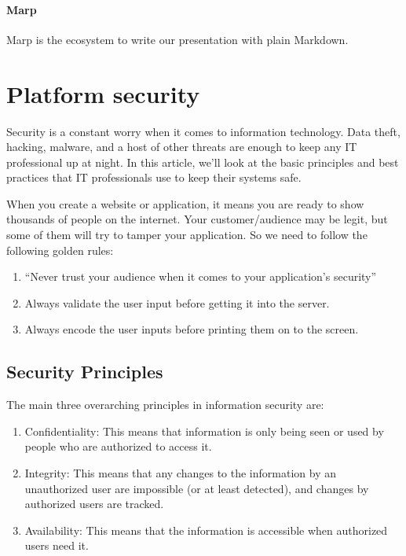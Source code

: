 \paragraph*{Marp}
Marp is the ecosystem to write our presentation with plain Markdown.


\section{Platform security}
Security is a constant worry when it comes to information technology. Data theft, hacking, malware, and a host of other threats are enough to keep any IT professional up at night. In this article, we’ll look at the basic principles and best practices that IT professionals use to keep their systems safe.

When you create a website or application, it means you are ready to show thousands of people on the internet. Your customer/audience may be legit, but some of them will try to tamper your application. So we need to follow the following golden rules:
\begin{enumerate}
      \item 
      “Never trust your audience when it comes to your application’s security”
      \item 
      Always validate the user input before getting it into the server.
      \item 
      Always encode the user inputs before printing them on to the screen.
\end{enumerate}

\subsection{Security Principles}
The main three overarching principles in information security are:
\begin{enumerate}
      \item 
      Confidentiality: This means that information is only being seen or used by people who are authorized to access it.
      \item 
      Integrity: This means that any changes to the information by an unauthorized user are impossible (or at least detected), and changes by authorized users are tracked.
      \item 
      Availability: This means that the information is accessible when authorized users need it.
\end{enumerate}

